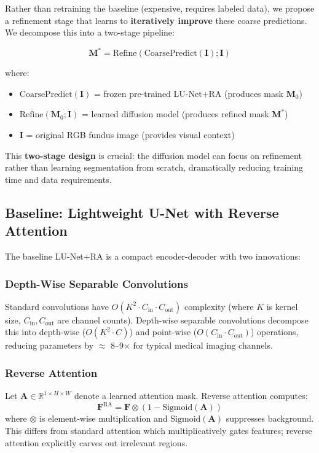 \documentclass[11pt]{article}
\begin{document}
Rather than retraining the baseline (expensive, requires labeled data), we propose a refinement stage that learns to \textbf{iteratively improve} these coarse predictions. We decompose this into a two-stage pipeline:

\begin{equation}
\mathbf{M}^* = \text{Refine}(\text{CoarsePredict}(\mathbf{I}); \mathbf{I})
\end{equation}

where:
\begin{itemize}
    \item $\text{CoarsePredict}(\mathbf{I})$ = frozen pre-trained LU-Net+RA (produces mask $\mathbf{M}_0$)
    \item $\text{Refine}(\mathbf{M}_0; \mathbf{I})$ = learned diffusion model (produces refined mask $\mathbf{M}^*$)
    \item $\mathbf{I}$ = original RGB fundus image (provides visual context)
\end{itemize}

This \textbf{two-stage design} is crucial: the diffusion model can focus on refinement rather than learning segmentation from scratch, dramatically reducing training time and data requirements.

\subsection{Baseline: Lightweight U-Net with Reverse Attention}

The baseline LU-Net+RA \cite{LU2023} is a compact encoder-decoder with two innovations:

\subsubsection{Depth-Wise Separable Convolutions}
Standard convolutions have $O(K^2 \cdot C_{\text{in}} \cdot C_{\text{out}})$ complexity (where $K$ is kernel size, $C_{\text{in}}, C_{\text{out}}$ are channel counts). Depth-wise separable convolutions decompose this into depth-wise ($O(K^2 \cdot C)$) and point-wise ($O(C_{\text{in}} \cdot C_{\text{out}})$) operations, reducing parameters by $\approx$ 8--9$\times$ for typical medical imaging channels.

\subsubsection{Reverse Attention}
Let $\mathbf{A} \in \mathbb{R}^{1 \times H \times W}$ denote a learned attention mask. Reverse attention computes:
\begin{equation}
\mathbf{F}^{\text{RA}} = \mathbf{F} \otimes (1 - \text{Sigmoid}(\mathbf{A}))
\end{equation}
where $\otimes$ is element-wise multiplication and $\text{Sigmoid}(\mathbf{A})$ suppresses background. This differs from standard attention which multiplicatively gates features; reverse attention explicitly carves out irrelevant regions.
\end{document}
